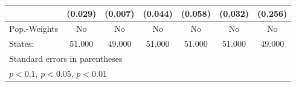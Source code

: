 {\begin{tabular}{l*{6}{c}}
            &     (0.029)         &     (0.007)         &     (0.044)         &     (0.058)         &     (0.032)         &     (0.256)         \\
\hline
Pop.-Weights&          No         &          No         &          No         &          No         &          No         &          No         \\
States:     &      51.000         &      49.000         &      51.000         &      51.000         &      51.000         &      49.000         \\
\hline\hline
\multicolumn{7}{l}{\footnotesize Standard errors in parentheses}\\
\multicolumn{7}{l}{\footnotesize \sym{*} \(p<0.1\), \sym{**} \(p<0.05\), \sym{***} \(p<0.01\)}\\
\end{tabular}
}
